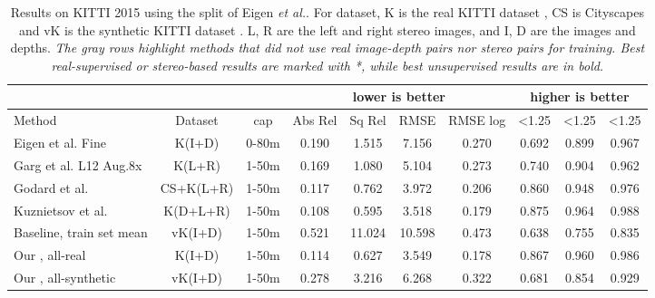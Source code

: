 \documentclass[runningheads]{llncs}
\def\etal{\emph{et al.}\xspace}
\begin{document}
\begin{table}[tb!]
	\begin{center}
		\tiny
		\renewcommand{\arraystretch}{1.6}
		\setlength{\arrayrulewidth}{0.8pt}
		\setlength{\tabcolsep}{0.5pt}
		\caption{Results on KITTI 2015 \cite{Menze2015CVPR} using the split of Eigen \etal \cite{eigen2014depth}. For dataset, K is the real KITTI dataset \cite{Menze2015CVPR}, CS is Cityscapes\cite{Cordts2016Cityscapes} and vK is the synthetic KITTI dataset \cite{gaidon2016virtualworlds}. L, R are the left and right stereo images, and I, D are the images and depths. \emph{The gray rows highlight methods that did not use real image-depth pairs nor stereo pairs for training. Best real-supervised or stereo-based results are marked with *, while best unsupervised results are in bold.}}
		\begin{tabular}{|l|c|c|c|c|c|c|c|c|c|}
			\hline
			\multicolumn{3}{|c|}{} &  \multicolumn{4}{c|}{\cellcolor[rgb]{0.6,0.8,1.0} lower is better} &  \multicolumn{3}{c|}{\cellcolor[rgb]{0.0,0.8,1.0} higher is better} \\
			\hline
			Method & Dataset & cap & \cellcolor[rgb]{0.6,0.8,1.0} {\tiny Abs Rel} & \cellcolor[rgb]{0.6,0.8,1.0} {\tiny Sq Rel} & \cellcolor[rgb]{0.6,0.8,1.0} {\tiny RMSE} & \cellcolor[rgb]{0.6,0.8,1.0} {\tiny RMSE log} & \cellcolor[rgb]{0.0,0.8,1.0} {\tiny <1.25} & \cellcolor[rgb]{0.0,0.8,1.0} {\tiny <1.25}  & \cellcolor[rgb]{0.0,0.8,1.0} {\tiny <1.25} \\
			\hline
			Eigen et al.\cite{eigen2014depth} Fine & K(I+D) & 0-80m & 0.190 & 1.515 & 7.156 & 0.270 & 0.692 & 0.899 & 0.967 \\
			\hline 
			Garg et al.\cite{garg2016unsupervised} L12 Aug.8x & K(L+R) & 1-50m & 0.169 & 1.080 & 5.104 & 0.273 & 0.740 & 0.904 & 0.962 \\  
			Godard et al. \cite{godard2017unsupervised} & CS+K(L+R) & 1-50m & 0.117 & 0.762 & 3.972 & 0.206 & 0.860 & 0.948 & 0.976 \\
			Kuznietsov et al. \cite{kuznietsov2017semi} & K(D+L+R) & 1-50m & 0.108 & 0.595 & 3.518 & 0.179 & 0.875 & 0.964 & 0.988 \\
			\hline
			\rowcolor[rgb]{0.9,0.9,0.9}
			Baseline, train set mean &  vK(I+D) & 1-50m & 0.521 & 11.024 & 10.598 & 0.473 & 0.638 & 0.755 & 0.835\\
			\hline
			Our , all-real  & K(I+D) & 1-50m & 0.114	& 0.627& 3.549 & 0.178 & 0.867 & 0.960 & 0.986 \\
			\rowcolor[rgb]{0.9,0.9,0.9}
			Our , all-synthetic  & vK(I+D) & 1-50m & 0.278 & 3.216 & 6.268 & 0.322 & 0.681 & 0.854 & 0.929\\

\end{tabular}
\end{center}
\end{table}
\end{document}
